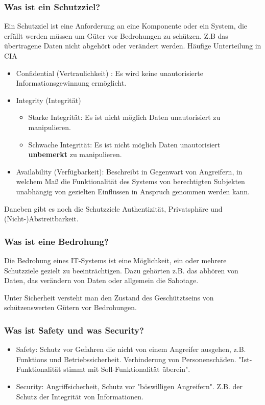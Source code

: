 	\subsubsection{Was ist ein Schutzziel?}
	Ein Schutzziel ist eine Anforderung an eine Komponente oder ein System, die erfüllt werden müssen um Güter vor Bedrohungen zu schützen. Z.B das übertragene Daten nicht abgehört oder verändert werden.
	Häufige Unterteilung in CIA
	\begin{itemize}
		\item Confidential (Vertraulichkeit) : Es wird keine unautorisierte Informationsgewinnung ermöglicht.
		\item Integrity (Integrität) 
		\begin{itemize}
			\item Starke Integrität: Es ist nicht möglich Daten unautorisiert zu manipulieren.
			\item Schwache Integrität: Es ist nicht möglich Daten unautorisiert \textbf{unbemerkt} zu manipulieren.
		\end{itemize}
		\item Availability (Verfügbarkeit): Beschreibt in Gegenwart von Angreifern, in welchem Maß die Funktionalität des Systems von berechtigten Subjekten unabhängig von gezielten Einflüssen in Anspruch genommen werden kann.
	\end{itemize}
	Daneben gibt es noch die Schutzziele Authentizität, Privatsphäre und (Nicht-)Abstreitbarkeit.
	
	\subsubsection{Was ist eine Bedrohung?}
	Die Bedrohung eines IT-Systems ist eine Möglichkeit, ein oder mehrere Schutzziele gezielt zu beeinträchtigen. Dazu gehörten z.B. das abhören von Daten, das verändern von Daten oder allgemein die Sabotage.
	
	Unter Sicherheit versteht man den Zustand des Geschütztseins von schützenswerten Gütern vor Bedrohungen. 
	\subsubsection{Was ist Safety und was Security?}
	\begin{itemize}
		\item Safety: Schutz vor Gefahren die nicht von einem Angreifer ausgehen, z.B. Funktions und Betriebssicherheit. Verhinderung von Personenschäden. "Ist-Funktionalität stimmt mit Soll-Funktionalität überein".
		\item Security: Angriffsicherheit, Schutz vor "böswilligen Angreifern". Z.B. der Schutz der Integrität von Informationen.
	\end{itemize}
	
